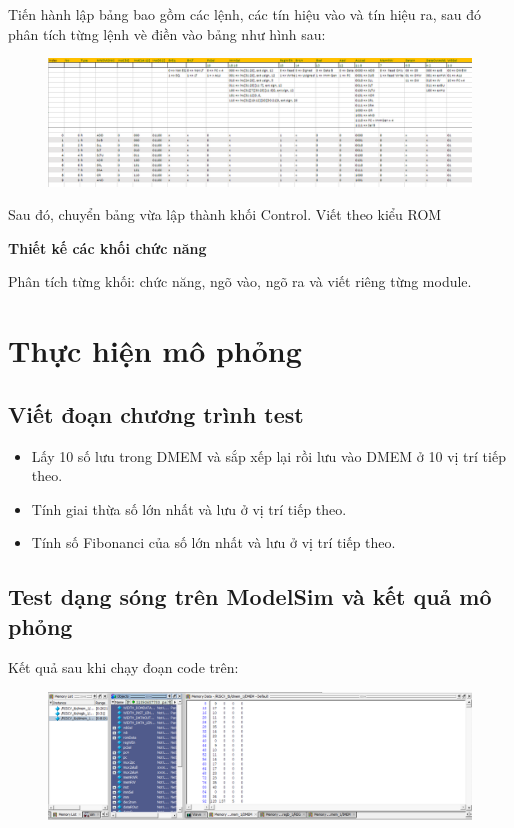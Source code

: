 \documentclass[E:/Latex/ExtraWork/ComputerArchitechture/Report.tex]{subfiles}
\begin{document}
\begin{otherlanguage}{english}
				Tiến hành lập bảng bao gồm các lệnh, các tín hiệu vào và tín hiệu ra, sau đó phân tích từng lệnh vè điền vào bảng như hình sau:
					\begin{figure}[h!]
						\includegraphics[scale = 0.6]{Figure/Fig2.png}
						\centering
					\end{figure}

				Sau đó, chuyển bảng vừa lập thành khối Control. Viết theo kiểu ROM

				\textbf {Thiết kế các khối chức năng }
				
				Phân tích từng khối: chức năng, ngõ vào, ngõ ra và viết riêng từng module.

				\newpage
				\section{Thực hiện mô phỏng}
				\subsection{Viết đoạn chương trình test}
				\begin{itemize}
					\item Lấy 10 số lưu trong DMEM và sắp xếp lại rồi lưu vào DMEM ở 10 vị trí tiếp theo.
					\item Tính giai thừa số lớn nhất và lưu ở vị trí tiếp theo.
					\item Tính số Fibonanci của số lớn nhất và lưu ở vị trí tiếp theo.
				\end{itemize}
				\subsection{Test dạng sóng trên ModelSim và kết quả mô phỏng}
				
				Kết quả sau khi chạy đoạn code trên: 
					\begin{figure}[h!]
						\includegraphics[scale = 0.5]{Figure/Fig3.png}
						\centering
					\end{figure}


\end{otherlanguage}
\end{document}
